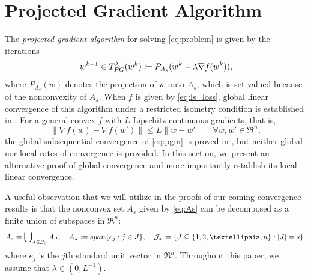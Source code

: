 \documentclass{article}
\newcommand{\alert}[1]{{#1}}
\theoremstyle{plain}
\theoremstyle{definition}
\theoremstyle{remark}
\newcommand{\J}{\mathcal{J}}
\newcommand\inner[2]{\left\langle #1, #2 \right\rangle}
\newcommand{\Tpg}{T_{\rm PG}^{\lambda}}
\begin{document}
\section{Projected Gradient Algorithm}\label{sec:pgm}
The \emph{projected gradient algorithm} for solving \cref{eq:problem} is given 
by the iterations
	\begin{equation}
	w ^{k+1} \in  \Tpg (w^k) \coloneqq P_{A_s}(w ^k - \lambda \nabla f(w 
	^k)), \label{eq:pgm}
	\end{equation}
where $P_{A_s}(w )$ denotes the projection of $w $ onto $A_s$,
which is set-valued because of the nonconvexity of $A_s$.
When $f$ is given by \cref{eq:ls_loss},
global linear convergence of this algorithm under a restricted
isometry condition is established in \citep{BT11}.
For a general convex $f$ with $L$-Lipschitz continuous
gradients, that is, 
	\begin{equation}
	\label{eq:L-lipschitz}
	\|\nabla f(w) - \nabla f(w') \| \leq L \|w - w '\| \quad \forall 
	w, w' \in \Re^n,
	\end{equation}
the global subsequential convergence of \cref{eq:pgm} is proved in 
\cite{BKM16}, but neither global nor local rates of convergence is provided.
In this section, we present an alternative proof of global convergence and
more importantly establish its local linear convergence.

A useful observation that we will utilize in the proofs of
our coming convergence results is that the nonconvex set
$A_s$ given by \cref{eq:As} can be decomposed as 
a finite union of subspaces in $\Re^n$:
	\begin{equation}
	\label{eq:As_decomp}
		A_s = \bigcup\nolimits _{J\in \J _s} A_{J}, \quad A_{J} \coloneqq {\rm
		span} \{ e_j: j\in J\}, \quad
	 \J_s \coloneqq \left\{ J\subseteq \{1,2,\dots,n\}: |J| = s\right\},
	\end{equation}
where $e_j$ is the $j$th standard unit vector in $\Re^n$. \alert{Throughout 
this paper, we assume that $\lambda\in (0,L^{-1})$.}
\end{document}
